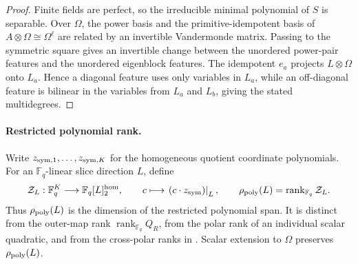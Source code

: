 \documentclass[11pt]{article}
\newcommand{\F}{\mathbb F}
\newcommand{\rank}{\operatorname{rank}}
\begin{document}
\begin{proof}
Finite fields are perfect, so the irreducible minimal polynomial of $S$ is
separable.  Over $\Omega$, the power basis and the primitive-idempotent basis
of $A\otimes\Omega\cong\Omega^\ell$ are related by an invertible Vandermonde
matrix.  Passing to the symmetric square gives an invertible change between the
unordered power-pair features and the unordered eigenblock features.  The
idempotent $e_a$ projects $L\otimes\Omega$ onto $L_a$.  Hence a diagonal
feature uses only variables in $L_a$, while an off-diagonal feature is bilinear
in the variables from $L_a$ and $L_b$, giving the stated multidegrees.
\end{proof}

\paragraph{Restricted polynomial rank.}
Write $z_{{\rm sym},1},\ldots,z_{{\rm sym},K}$ for the homogeneous quotient
coordinate polynomials.  For an $\F_q$-linear slice direction $L$, define
\[
 \mathcal Z_L:\F_q^K\longrightarrow\F_q[L]^{\rm hom}_2,
 \qquad
 c\longmapsto\left.(c\cdot z_{\rm sym})\right|_L,
 \qquad
 \rho_{\rm poly}(L)=\rank_{\F_q}\mathcal Z_L.
\]
Thus $\rho_{\rm poly}(L)$ is the dimension of the restricted polynomial
span.  It is distinct from the outer-map rank $\rank_{\F_q}Q_R$, from the
polar rank of an individual scalar quadratic, and from the cross-polar ranks
in .  Scalar extension to $\Omega$ preserves
$\rho_{\rm poly}(L)$.
\end{document}
